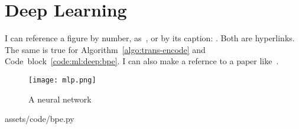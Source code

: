 \section{Deep Learning}\label{sec:ml:deep}

I can reference a figure by number, as~,
or by its caption: .
Both are hyperlinks.
The same is true for Algorithm~\ref{algo:trans-encode} and Code~block~\ref{code:ml:deep:bpe}.
I can also make a refernce to a paper like~\cite{hemdan2023integrating}.
\begin{figure}[hbt]
    \begin{center}
        \texttt{[image: mlp.png]}
    \end{center}
    \caption{A neural network}%
    \label{fig:ml:deep:neuralnet}
\end{figure}
%
{assets/code/bpe.py}
